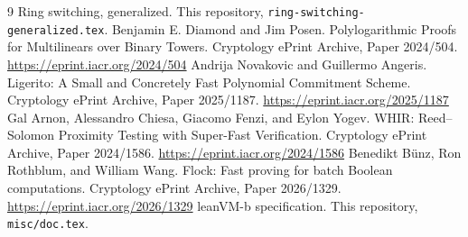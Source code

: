 \documentclass[11pt]{article}
\begin{document}
\begin{thebibliography}{9}
 Ring switching, generalized. This repository,
\texttt{ring-switching-generalized.tex}.
 Benjamin E. Diamond and Jim Posen. Polylogarithmic Proofs for
Multilinears over Binary Towers. Cryptology ePrint Archive, Paper 2024/504.
\url{https://eprint.iacr.org/2024/504}
 Andrija Novakovic and Guillermo Angeris. Ligerito: A Small
and Concretely Fast Polynomial Commitment Scheme. Cryptology ePrint Archive,
Paper 2025/1187. \url{https://eprint.iacr.org/2025/1187}
 Gal Arnon, Alessandro Chiesa, Giacomo Fenzi, and Eylon
Yogev. WHIR: Reed--Solomon Proximity Testing with Super-Fast Verification.
Cryptology ePrint Archive, Paper 2024/1586.
\url{https://eprint.iacr.org/2024/1586}
 Benedikt B\"unz, Ron Rothblum, and William Wang. Flock: Fast
proving for batch Boolean computations. Cryptology ePrint Archive, Paper
2026/1329. \url{https://eprint.iacr.org/2026/1329}
 leanVM-b specification. This repository,
\texttt{misc/doc.tex}.
\end{thebibliography}
\end{document}
